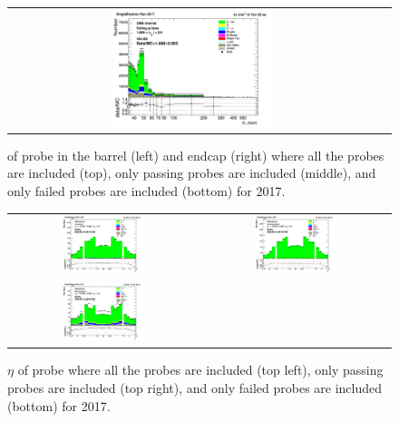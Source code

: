 \begin{figure}[htp]
\begin{center}
\begin{tabular}{cc}
      \includegraphics[width=0.45\textwidth]{figures/Zprime/2017/ScaleFactor/SameSign/nominal/stack_Et_Endcap_fail_PUW.png}
    \end{tabular}
    \caption{\et of probe in the barrel (left) and endcap (right) where all the probes are included (top), only passing probes are included (middle), and only failed probes are included (bottom) for 2017.}
    \label{fig:SS_nominal_Et_2017}
  \end{center}
\end{figure}
\begin{figure}[htp]
  \begin{center}
    \begin{tabular}{cc}
      \includegraphics[width=0.45\textwidth]{figures/Zprime/2017/ScaleFactor/SameSign/nominal/stack_eta_BE_Barrel+Endcap_probes_PUW.png} &
      \includegraphics[width=0.45\textwidth]{figures/Zprime/2017/ScaleFactor/SameSign/nominal/stack_eta_BE_Barrel+Endcap_pass_PUW.png} \\
      \includegraphics[width=0.45\textwidth]{figures/Zprime/2017/ScaleFactor/SameSign/nominal/stack_eta_BE_Barrel+Endcap_fail_PUW.png} &
    \end{tabular}
    \caption{$\eta$ of probe where all the probes are included (top left), only passing probes are included (top right), and only failed probes are included (bottom) for 2017.}
    \label{fig:SS_nominal_eta_2017}
  \end{center}
\end{figure}
